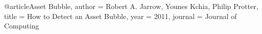 





@article{Asset Bubble,
author = {Robert A. Jarrow, Younes Kchia, Philip Protter}, 
title = {How to Detect an Asset Bubble}, 
year = {2011}, 
journal = {Journal of Computing} 
}
